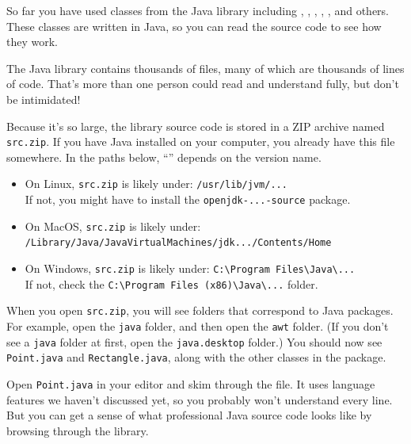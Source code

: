
So far you have used classes from the Java library including , , , , , and others.
These classes are written in Java, so you can read the source code to see how they work.


The Java library contains thousands of files, many of which are thousands of lines of code.
That's more than one person could read and understand fully, but don't be intimidated!

Because it's so large, the library source code is stored in a ZIP archive named \verb|src.zip|.
If you have Java installed on your computer, you already have this file somewhere.
In the paths below, ``'' depends on the version name.

\begin{itemize}
\item On Linux, \verb|src.zip| is likely under: \verb"/usr/lib/jvm/..."
\\ If not, you might have to install the {\tt openjdk-...-source} package.

\item On MacOS, \verb|src.zip| is likely under: \\ \verb"/Library/Java/JavaVirtualMachines/jdk.../Contents/Home"

\item On Windows, \verb|src.zip| is likely under: \verb"C:\Program Files\Java\..."
\\ If not, check the \verb"C:\Program Files (x86)\Java\..." folder.
\end{itemize}

When you open \verb|src.zip|, you will see folders that correspond to Java packages.
For example, open the {\tt java} folder, and then open the {\tt awt} folder.
(If you don't see a {\tt java} folder at first, open the {\tt java.desktop} folder.)
You should now see {\tt Point.java} and {\tt Rectangle.java}, along with the other classes in the  package.

Open {\tt Point.java} in your editor and skim through the file.
It uses language features we haven't discussed yet, so you probably won't understand every line.
But you can get a sense of what professional Java source code looks like by browsing through the library.


